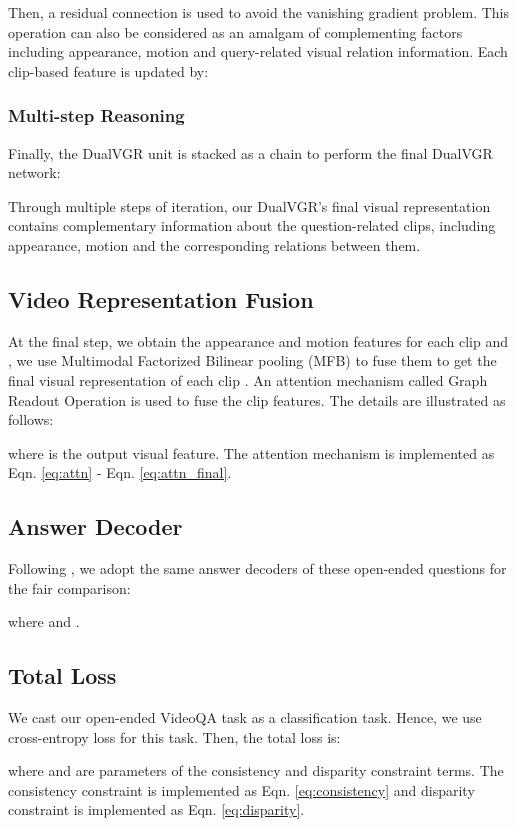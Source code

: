 \documentclass[journal]{IEEEtran}
\begin{document}
Then, a residual connection \cite{he2016deep} is used to avoid the vanishing gradient problem. This operation can also be considered as an amalgam of complementing factors including appearance, motion and query-related visual relation information. Each clip-based feature is updated by:


\subsubsection{Multi-step Reasoning} 
Finally, the DualVGR unit is stacked as a chain to perform the final DualVGR network:


Through multiple steps of iteration, our DualVGR's final visual representation contains complementary information about the question-related clips, including appearance, motion and the corresponding relations between them. 

\subsection{Video Representation Fusion}
At the final step, we obtain the appearance and motion features for each clip  and , we use Multimodal Factorized Bilinear pooling (MFB) \cite{yu2017multi} to fuse them to get the final visual representation of each clip . An attention mechanism called Graph Readout Operation \cite{wu2020comprehensive} is used to fuse the clip features. The details are illustrated as follows:

where  is the output visual feature. The attention mechanism is implemented as Eqn. \eqref{eq:attn} - Eqn. \eqref{eq:attn_final}.

\subsection{Answer Decoder}
Following \cite{le2020hierarchical}, we adopt the same answer decoders of these open-ended questions for the fair comparison:

where  and .
\subsection{Total Loss}\label{sec:Loss}
We cast our open-ended VideoQA task as a classification task. Hence, we use cross-entropy loss  for this task. Then, the total loss is:

where  and  are parameters of the consistency and disparity constraint terms. The consistency constraint is implemented as Eqn. \eqref{eq:consistency} and disparity constraint is implemented as Eqn. \eqref{eq:disparity}.
\end{document}
